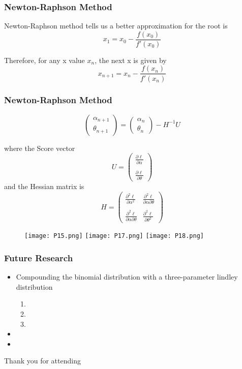 \documentclass{beamer}
\begin{document}
\begin{frame}
\frametitle{Newton-Raphson Method}
Newton-Raphson method tells us a better approximation for the root is
\[
x_{1}=x_{0}-\frac{f(x_{0})}{f'(x_{0})}
\]

\bigskip
Therefore, for any x value $x_{n}$, the next x is given by
\[
x_{n+1}=x_{n}-\frac{f(x_{n})}{f'(x_{n})}
\]

\end{frame}

\begin{frame}
\frametitle{Newton-Raphson Method}
\[
\begin{pmatrix}
\alpha_{n+1}\\
\theta_{n+1}
\end{pmatrix}
=\begin{pmatrix}
\alpha_{n}\\
\theta_{n}
\end{pmatrix}
- H^{-1}U
\]

\medskip
where the Score vector
\[ 
U=\begin{pmatrix} 
\frac{\partial \ell}{\partial \alpha} \\  
\\[0.1mm]\frac{\partial \ell}{\partial \theta}
\end{pmatrix}
\]
and the Hessian matrix is
\[
H=\begin{pmatrix} 
\frac{\partial^2 \ell}{\partial \alpha^2} & \frac{\partial^2 \ell}{\partial \alpha \partial \theta}\\  
\\ \frac{\partial^2 \ell}{\partial \alpha \partial \theta} & \frac{\partial^2 \ell}{\partial \theta^2}
\end{pmatrix}
\]
\end{frame}

\begin{frame}
\begin{figure}
\texttt{[image: P15.png]}
\texttt{[image: P17.png]}
\texttt{[image: P18.png]}
\end{figure}
\end{frame}


\begin{frame}
\frametitle{Future Research}
\begin{itemize}
	\item Compounding the binomial distribution with a three-parameter lindley distribution
	\vspace{2mm}
	\begin{enumerate}
        \item  
        \vspace{2mm}
        \item 
        \vspace{2mm}
        \item  
        \vspace{2mm}
        \end{enumerate}
	\vspace{2mm}
	\item 
	\vspace{2mm}
    \item 
	\end{itemize}
\end{frame}

\begin{frame}
	\begin{center}
		\LARGE Thank you for attending\\
	\end{center}
	
\end{frame}
\end{document}
